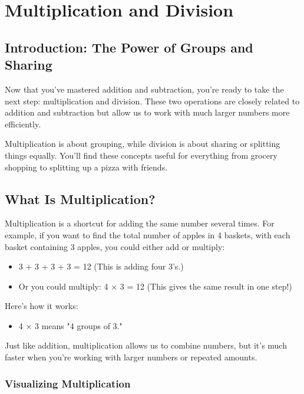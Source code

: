 \chapter{Multiplication and Division}

\section{Introduction: The Power of Groups and Sharing}
Now that you’ve mastered addition and subtraction, you’re ready to take the next step: multiplication and division. These two operations are closely related to addition and subtraction but allow us to work with much larger numbers more efficiently.

Multiplication is about grouping, while division is about sharing or splitting things equally. You’ll find these concepts useful for everything from grocery shopping to splitting up a pizza with friends.

\section{What Is Multiplication?}
Multiplication is a shortcut for adding the same number several times. For example, if you want to find the total number of apples in 4 baskets, with each basket containing 3 apples, you could either add or multiply:
\begin{itemize}
    \item 3 + 3 + 3 + 3 = 12 (This is adding four 3’s.)
    \item Or you could multiply: 4 × 3 = 12 (This gives the same result in one step!)
\end{itemize}

Here’s how it works:
\begin{itemize}
    \item 4 × 3 means "4 groups of 3."
\end{itemize}

Just like addition, multiplication allows us to combine numbers, but it’s much faster when you’re working with larger numbers or repeated amounts.
\subsection{Visualizing Multiplication}
\center
\endcenter

